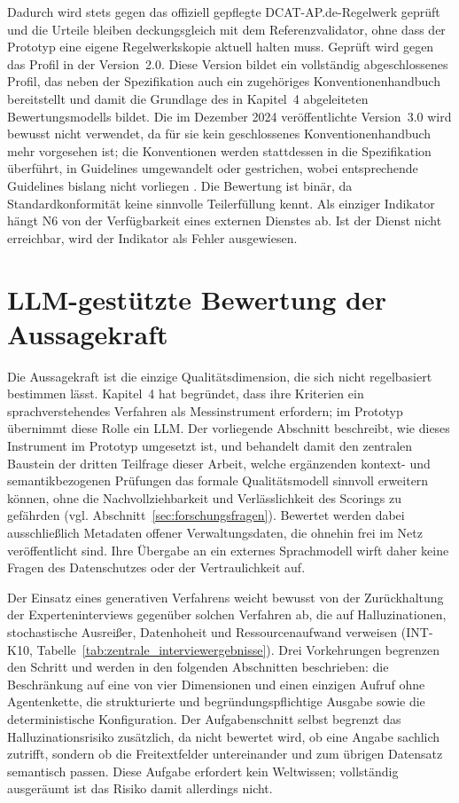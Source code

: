 \pagebreak

Dadurch wird stets gegen das offiziell gepflegte DCAT-AP.de-Regelwerk geprüft und die Urteile bleiben deckungsgleich mit dem Referenzvalidator, ohne dass der Prototyp eine eigene Regelwerkskopie aktuell halten muss. Geprüft wird gegen das Profil in der Version~2.0. Diese Version bildet ein vollständig abgeschlossenes Profil, das neben der Spezifikation auch ein zugehöriges Konventionenhandbuch bereitstellt \cite{DCATAPDESpec2, DCATAPDEImplRules2} und damit die Grundlage des in Kapitel~4 abgeleiteten Bewertungsmodells bildet. Die im Dezember 2024 veröffentlichte Version~3.0 wird bewusst nicht verwendet, da für sie kein geschlossenes Konventionenhandbuch mehr vorgesehen ist; die Konventionen werden stattdessen in die Spezifikation überführt, in Guidelines umgewandelt oder gestrichen, wobei entsprechende Guidelines bislang nicht vorliegen \cite{DCATAPDESpec3}. Die Bewertung ist binär, da Standardkonformität keine sinnvolle Teilerfüllung kennt. Als einziger Indikator hängt N6 von der Verfügbarkeit eines externen Dienstes ab. Ist der Dienst nicht erreichbar, wird der Indikator als Fehler ausgewiesen.

\section{LLM-gestützte Bewertung der Aussagekraft}
\label{sec:llm_aussagekraft}

Die Aussagekraft ist die einzige Qualitätsdimension, die sich nicht regelbasiert bestimmen lässt. Kapitel~4 hat begründet, dass ihre Kriterien ein sprachverstehendes Verfahren als Messinstrument erfordern; im Prototyp übernimmt diese Rolle ein \acrfull{LLM}. Der vorliegende Abschnitt beschreibt, wie dieses Instrument im Prototyp umgesetzt ist, und behandelt damit den zentralen Baustein der dritten Teilfrage dieser Arbeit, welche ergänzenden kontext- und semantikbezogenen Prüfungen das formale Qualitätsmodell sinnvoll erweitern können, ohne die Nachvollziehbarkeit und Verlässlichkeit des Scorings zu gefährden (vgl. Abschnitt~\ref{sec:forschungsfragen}). Bewertet werden dabei ausschließlich Metadaten offener Verwaltungsdaten, die ohnehin frei im Netz veröffentlicht sind. Ihre Übergabe an ein externes Sprachmodell wirft daher keine Fragen des Datenschutzes oder der Vertraulichkeit auf.

Der Einsatz eines generativen Verfahrens weicht bewusst von der Zurückhaltung der Experteninterviews gegenüber solchen Verfahren ab, die auf Halluzinationen, stochastische Ausreißer, Datenhoheit und Ressourcenaufwand verweisen (INT-K10, Tabelle~\ref{tab:zentrale_interviewergebnisse}). Drei Vorkehrungen begrenzen den Schritt und werden in den folgenden Abschnitten beschrieben: die Beschränkung auf eine von vier Dimensionen und einen einzigen Aufruf ohne Agentenkette, die strukturierte und begründungspflichtige Ausgabe sowie die deterministische Konfiguration. Der Aufgabenschnitt selbst begrenzt das Halluzinationsrisiko zusätzlich, da nicht bewertet wird, ob eine Angabe sachlich zutrifft, sondern ob die Freitextfelder untereinander und zum übrigen Datensatz semantisch passen. Diese Aufgabe erfordert kein Weltwissen; vollständig ausgeräumt ist das Risiko damit allerdings nicht.

